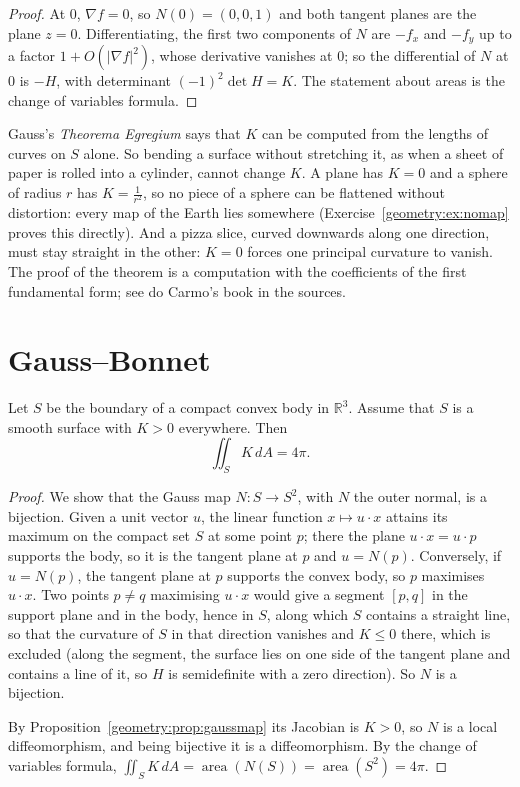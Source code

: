 \begin{proof}
At $0$, $\nabla f=0$, so $N(0)=(0,0,1)$ and both tangent planes are the plane $z=0$. Differentiating, the first two components of $N$ are $-f_x$ and $-f_y$ up to a
factor $1+O(|\nabla f|^2)$, whose derivative vanishes at $0$; so the differential of $N$ at $0$ is $-H$, with determinant $(-1)^2\det H=K$. The statement about
areas is the change of variables formula.
\end{proof}

\begin{remark}
Gauss's \emph{Theorema Egregium} says that $K$ can be computed from the lengths of curves on $S$ alone. So bending a surface without stretching it, as when a sheet of
paper is rolled into a cylinder, cannot change $K$. A plane has $K=0$ and a sphere of radius $r$ has $K=\frac1{r^2}$, so no piece of a sphere can be flattened without
distortion: every map of the Earth lies somewhere (Exercise~\ref{geometry:ex:nomap} proves this directly). And a pizza slice, curved downwards along one direction,
must stay straight in the other: $K=0$ forces one principal curvature to vanish. The proof of the theorem is a computation with the coefficients of the first
fundamental form; see do Carmo's book in the sources.
\end{remark}

\section{Gauss--Bonnet}

\begin{theorem}\label{geometry:thm:gbconvex}
Let $S$ be the boundary of a compact convex body in $\mathbb R^3$. Assume that $S$ is a smooth surface with $K>0$ everywhere. Then
\[
\iint_SK\,dA=4\pi.
\]
\end{theorem}

\begin{proof}
We show that the Gauss map $N:S\to S^2$, with $N$ the outer normal, is a bijection. Given a unit vector $u$, the linear function $x\mapsto u\cdot x$ attains its maximum
on the compact set $S$ at some point $p$; there the plane $u\cdot x=u\cdot p$ supports the body, so it is the tangent plane at $p$ and $u=N(p)$. Conversely, if $u=N(p)$, the
tangent plane at $p$ supports the convex body, so $p$ maximises $u\cdot x$. Two points $p\ne q$ maximising $u\cdot x$ would give a segment $[p,q]$ in the support plane
and in the body, hence in $S$, along which $S$ contains a straight line, so that the curvature of $S$ in that direction vanishes and $K\le0$ there, which is excluded
(along the segment, the surface lies on one side of the tangent plane and contains a line of it, so $H$ is semidefinite with a zero direction). So $N$ is a bijection.

By Proposition~\ref{geometry:prop:gaussmap} its Jacobian is $K>0$, so $N$ is a local diffeomorphism, and being bijective it is a diffeomorphism. By the change of variables
formula, $\iint_SK\,dA=\operatorname{area}(N(S))=\operatorname{area}(S^2)=4\pi$.
\end{proof}

